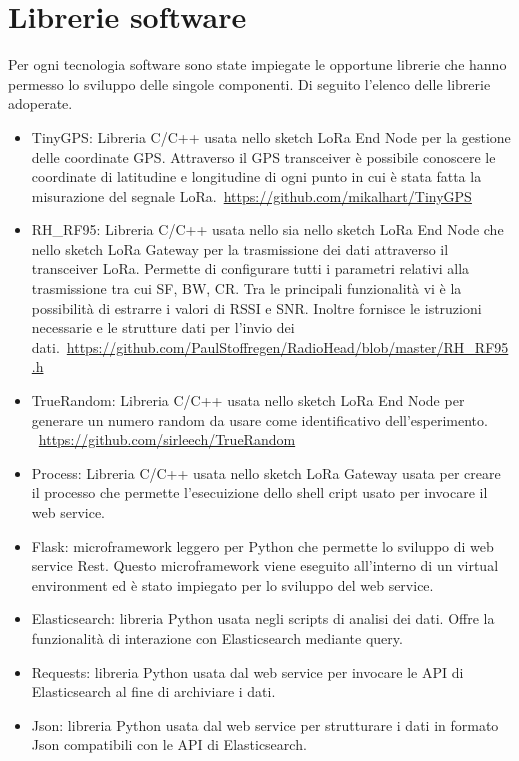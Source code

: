 \documentclass[12pt,a4paper,openright,twoside]{report}
\begin{document}
\section{Librerie software}
Per ogni tecnologia software sono state impiegate le opportune librerie che hanno permesso lo sviluppo delle singole componenti. 
Di seguito l'elenco delle librerie adoperate.
\begin{itemize}
    \item TinyGPS: Libreria C/C++ usata nello sketch LoRa End Node per la gestione delle coordinate GPS. Attraverso il GPS transceiver \`e possibile conoscere le coordinate di latitudine e longitudine di ogni punto in cui \`e stata fatta la misurazione del segnale LoRa.\
    \url{https://github.com/mikalhart/TinyGPS}
    \item RH\_RF95: Libreria C/C++ usata nello sia nello sketch LoRa End Node che nello sketch LoRa Gateway per la trasmissione dei dati attraverso il transceiver LoRa. Permette di configurare tutti i parametri relativi alla trasmissione tra cui SF, BW, CR. Tra le principali funzionalit\`a vi \`e la possibilit\`a di estrarre i valori di RSSI e SNR. Inoltre fornisce le istruzioni necessarie e le strutture dati per l'invio dei dati.\ 
    \url{https://github.com/PaulStoffregen/RadioHead/blob/master/RH_RF95.h}
    \item TrueRandom: Libreria C/C++ usata nello sketch LoRa End Node per generare un numero random da usare come identificativo dell'esperimento. \ 
    \url{https://github.com/sirleech/TrueRandom}
    \item Process: Libreria C/C++ usata nello sketch LoRa Gateway usata per creare il processo che permette l'esecuizione dello shell cript usato per invocare il web service.
    \item Flask: microframework leggero per Python che permette lo sviluppo di web service Rest. Questo microframework viene eseguito all'interno di un virtual environment ed \`e stato impiegato per lo sviluppo del web service.
    \item Elasticsearch: libreria Python usata negli scripts di analisi dei dati. Offre la funzionalit\`a di interazione con Elasticsearch mediante query. 
    \item Requests: libreria Python usata dal web service per invocare le API di Elasticsearch al fine di archiviare i dati.
    \item Json: libreria Python usata dal web service per strutturare i dati in formato Json compatibili con le API di Elasticsearch. 
\end{itemize}
\end{document}
